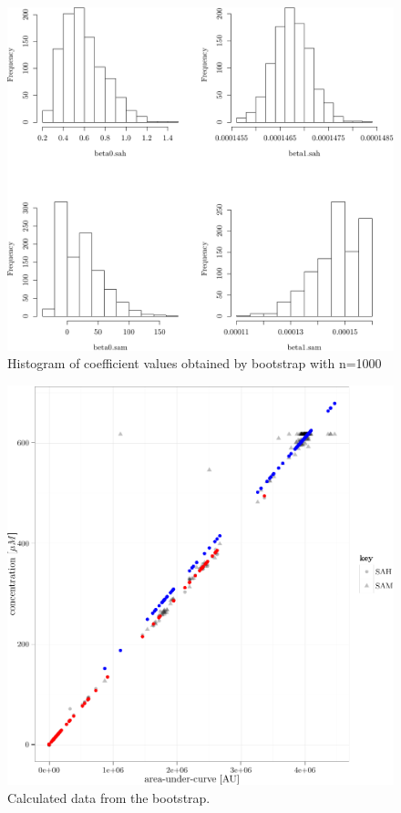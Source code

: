 \documentclass[]{tufte-handout}
\begin{document}
\begin{figure}
 \includegraphics{tufte_files/figure-latex/unnamed-chunk-11-1.pdf}
\caption{Histogram of coefficient values obtained by bootstrap with n=1000}
\end{figure}\begin{figure}
 \includegraphics{tufte_files/figure-latex/unnamed-chunk-11-2.pdf}
\caption{Calculated data from the bootstrap.}
\end{figure}
\end{document}
